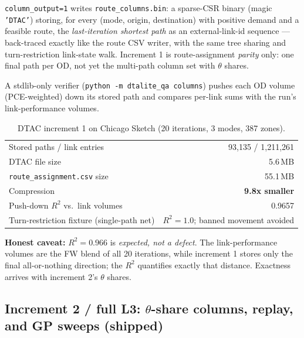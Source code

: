 \documentclass[10pt]{article}
\newcommand{\code}[1]{\texttt{#1}}
\begin{document}
\code{column\_output=1} writes \code{route\_columns.bin}: a sparse-CSR binary
(magic \code{'DTAC'}) storing, for every (mode, origin, destination) with
positive demand and a feasible route, the \emph{last-iteration shortest path}
as an external-link-id sequence --- back-traced exactly like the route CSV
writer, with the same tree sharing and turn-restriction link-state walk.
Increment 1 is route-assignment \emph{parity} only: one final path per OD, not
yet the multi-path column set with $\theta$ shares.

A stdlib-only verifier (\code{python -m dtalite\_qa columns}) pushes each OD
volume (PCE-weighted) down its stored path and compares per-link sums with the
run's link-performance volumes.

\begin{table}[h]
\centering
\caption{DTAC increment 1 on Chicago Sketch (20 iterations, 3 modes, 387 zones).}
\label{tab:dtac}
\begin{tabular}{lr}
\toprule
Stored paths / link entries & 93{,}135 / 1{,}211{,}261 \\
DTAC file size              & 5.6\,MB \\
\code{route\_assignment.csv} size & 55.1\,MB \\
Compression                 & \textbf{9.8x smaller} \\
Push-down $R^2$ vs.\ link volumes & 0.9657 \\
Turn-restriction fixture (single-path net) & $R^2 = 1.0$; banned movement avoided \\
\bottomrule
\end{tabular}
\end{table}

\textbf{Honest caveat:} $R^2 = 0.966$ is \emph{expected, not a defect}. The
link-performance volumes are the FW blend of all 20 iterations, while increment
1 stores only the final all-or-nothing direction; the $R^2$ quantifies exactly
that distance. Exactness arrives with increment 2's $\theta$ shares.

\subsection{Increment 2 / full L3: $\theta$-share columns, replay, and GP
sweeps (shipped)}
\end{document}
